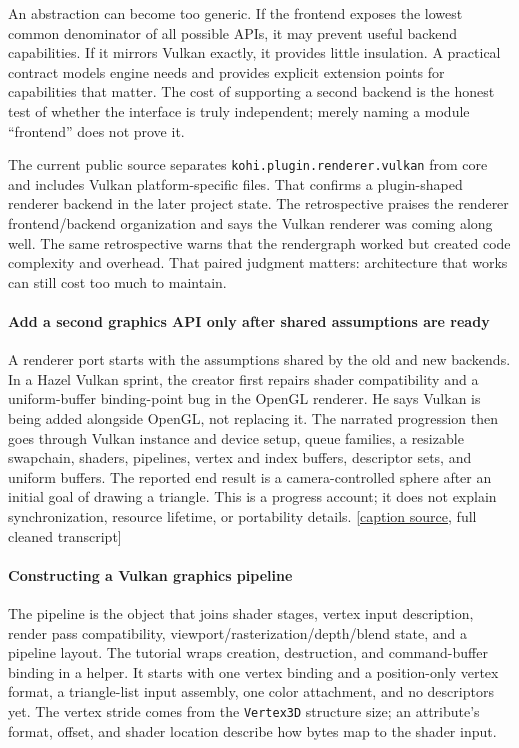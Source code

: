 An abstraction can become too generic. If the frontend exposes the lowest common denominator of all possible APIs, it may prevent useful backend capabilities. If it mirrors Vulkan exactly, it provides little insulation. A practical contract models engine needs and provides explicit extension points for capabilities that matter. The cost of supporting a second backend is the honest test of whether the interface is truly independent; merely naming a module ``frontend'' does not prove it.

The current public source separates \texttt{kohi.plugin.renderer.vulkan} from core and includes Vulkan platform-specific files. That confirms a plugin-shaped renderer backend in the later project state. The retrospective praises the renderer frontend/backend organization and says the Vulkan renderer was coming along well. The same retrospective warns that the rendergraph worked but created code complexity and overhead. That paired judgment matters: architecture that works can still cost too much to maintain.

\paragraph{Add a second graphics API only after shared assumptions are ready}\label{add-a-second-graphics-api-only-after-shared-assumptions-are-ready}

A renderer port starts with the assumptions shared by the old and new backends. In a Hazel Vulkan sprint, the creator first repairs shader compatibility and a uniform-buffer binding-point bug in the OpenGL renderer. He says Vulkan is being added alongside OpenGL, not replacing it. The narrated progression then goes through Vulkan instance and device setup, queue families, a resizable swapchain, shaders, pipelines, vertex and index buffers, descriptor sets, and uniform buffers. The reported end result is a camera-controlled sphere after an initial goal of drawing a triangle. This is a progress account; it does not explain synchronization, resource lifetime, or portability details. {[}\href{https://www.youtube.com/watch?v=zUdaT19aSxA}{caption source}, full cleaned transcript{]}

\paragraph{Constructing a Vulkan graphics pipeline}\label{constructing-a-vulkan-graphics-pipeline}

The pipeline is the object that joins shader stages, vertex input description, render pass compatibility, viewport/rasterization/depth/blend state, and a pipeline layout. The tutorial wraps creation, destruction, and command-buffer binding in a helper. It starts with one vertex binding and a position-only vertex format, a triangle-list input assembly, one color attachment, and no descriptors yet. The vertex stride comes from the \texttt{Vertex3D} structure size; an attribute's format, offset, and shader location describe how bytes map to the shader input.

